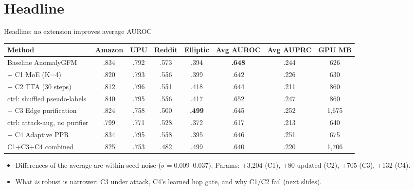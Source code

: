 \documentclass[aspectratio=169,11pt]{beamer}
\begin{document}
\section{Headline}
\begin{frame}{Headline: no extension improves average AUROC}
\centering\scriptsize
\begin{tabular}{lccccccc}
\toprule
Method & Amazon & UPU & Reddit & Elliptic & \textbf{Avg AUROC} & Avg AUPRC & GPU MB\\ \midrule
Baseline AnomalyGFM & .834 & .792 & .573 & .394 & \textbf{.648} & .244 & 626\\
+ C1 MoE (K=4) & .820 & .793 & .556 & .399 & .642 & .226 & 630\\
+ C2 TTA (30 steps) & .812 & .796 & .551 & .418 & .644 & .211 & 860\\
\hspace{3pt}ctrl: shuffled pseudo-labels & .840 & .795 & .556 & .417 & .652 & .247 & 860\\
+ C3 Edge purification & .824 & .758 & .500 & \textcolor{good}{\textbf{.499}} & .645 & .252 & 1,675\\
\hspace{3pt}ctrl: attack-aug, no purifier & .799 & .771 & .528 & .372 & .617 & .213 & 640\\
+ C4 Adaptive PPR & .834 & .795 & .558 & .395 & .646 & .251 & 675\\
C1+C3+C4 combined & .825 & .753 & .482 & .499 & .640 & .220 & 1,706\\ \bottomrule
\end{tabular}
\vspace{6pt}
\begin{itemize}\footnotesize
\item Differences of the average are within seed noise ($\sigma=0.009$--$0.037$). Params: +3,204 (C1), +80 updated (C2), +705 (C3), +132 (C4).
\item What \emph{is} robust is narrower: C3 under attack, C4's learned hop gate, and why C1/C2 fail (next slides).
\end{itemize}
\end{frame}
\end{document}
